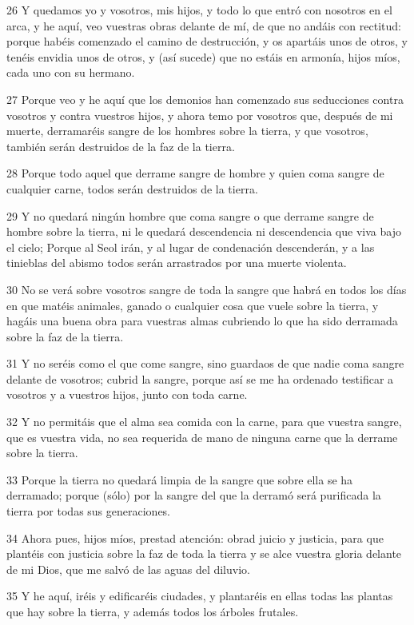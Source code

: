 \par 26 Y quedamos yo y vosotros, mis hijos, y todo lo que entró con nosotros en el arca, y he aquí, veo vuestras obras delante de mí, de que no andáis con rectitud: porque habéis comenzado el camino de destrucción, y os apartáis unos de otros, y tenéis envidia unos de otros, y (así sucede) que no estáis en armonía, hijos míos, cada uno con su hermano.
\par 27 Porque veo y he aquí que los demonios han comenzado sus seducciones contra vosotros y contra vuestros hijos, y ahora temo por vosotros que, después de mi muerte, derramaréis sangre de los hombres sobre la tierra, y que vosotros, también serán destruidos de la faz de la tierra.
\par 28 Porque todo aquel que derrame sangre de hombre y quien coma sangre de cualquier carne, todos serán destruidos de la tierra.
\par 29 Y no quedará ningún hombre que coma sangre o que derrame sangre de hombre sobre la tierra, ni le quedará descendencia ni descendencia que viva bajo el cielo; Porque al Seol irán, y al lugar de condenación descenderán, y a las tinieblas del abismo todos serán arrastrados por una muerte violenta.
\par 30 No se verá sobre vosotros sangre de toda la sangre que habrá en todos los días en que matéis animales, ganado o cualquier cosa que vuele sobre la tierra, y hagáis una buena obra para vuestras almas cubriendo lo que ha sido derramada sobre la faz de la tierra.
\par 31 Y no seréis como el que come sangre, sino guardaos de que nadie coma sangre delante de vosotros; cubrid la sangre, porque así se me ha ordenado testificar a vosotros y a vuestros hijos, junto con toda carne.
\par 32 Y no permitáis que el alma sea comida con la carne, para que vuestra sangre, que es vuestra vida, no sea requerida de mano de ninguna carne que la derrame sobre la tierra.
\par 33 Porque la tierra no quedará limpia de la sangre que sobre ella se ha derramado; porque (sólo) por la sangre del que la derramó será purificada la tierra por todas sus generaciones.
\par 34 Ahora pues, hijos míos, prestad atención: obrad juicio y justicia, para que plantéis con justicia sobre la faz de toda la tierra y se alce vuestra gloria delante de mi Dios, que me salvó de las aguas del diluvio.
\par 35 Y he aquí, iréis y edificaréis ciudades, y plantaréis en ellas todas las plantas que hay sobre la tierra, y además todos los árboles frutales.
